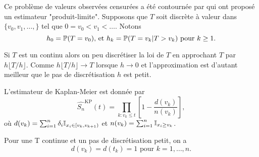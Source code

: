 Ce problème de valeurs observées censurées a été contournée par \citet{Kaplan1958} qui ont proposé un estimateur "produit-limite". Supposons que $T$ soit discrète à valeur dans $\{v_0,v_1,\ldots,\}$ tel que $0=v_0<v_1<\ldots$. Notons 
$$
h_0 =\mathbb{P}(T=v_0)\text{, et } h_k=\mathbb{P}(T=v_k|T> v_{k})\text{ pour } k\geq 1.
$$
\begin{remark}
Si $T$ est un \va continu alors on peu discrétiser la loi de $T$ en approchant $T$ par $h\lfloor T/h\rfloor$. Comme $h\lfloor T/h\rfloor\rightarrow T$ lorsque $h\rightarrow 0$ et l'approximation est d'autant meilleur que le pas de discrétisation $h$ est petit. 
\end{remark}
\begin{theo}
L'estimateur de Kaplan-Meier est donnée par 
\begin{equation}\label{eq:estimateur_KP}
\widehat{S_n}^{\text{KP}}(t) = \prod_{k: v_k\leq t}\left[1-\frac{d(v_k)}{n(v_k)}\right],
\end{equation}
où $d(v_k) = \sum_{i = 1}^n\delta_i\mathbb{I}_{x_i\in [v_k,v_{k+1})}$ et $n(v_k) = \sum_{i = 1}^n\mathbb{I}_{x_i\geq v_k}$. 
\end{theo}
\begin{remark}
Pour une \va T continue et un pas de discrétisation petit, on a 
$$
d(v_k) = d(t_k) = 1\text{ pour }k = 1,\ldots, n.
$$
\end{remark}
